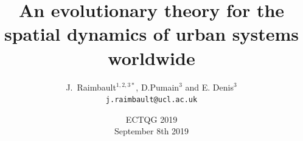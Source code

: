 



\title{An evolutionary theory for the spatial dynamics of urban systems worldwide}
\author{J.~Raimbault$^{1,2,3\ast}$, D.Pumain$^3$ and E. Denis$^3$\\
\texttt{j.raimbault@ucl.ac.uk}
}




\date{ECTQG 2019\\
September 8th 2019
}

\frame{\maketitle}


